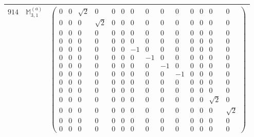 \documentclass[fleqn,8pt,landscape]{jsarticle}
\begin{document}
\begin{center}
\begin{longtable}{ccc}
$ 914 $ & $ \mathbb{M}_{3,1}^{(a)} $ & $ \begin{pmatrix} 0 & 0 & \sqrt{2} & 0 & 0 & 0 & 0 & 0 & 0 & 0 & 0 & 0 & 0 & 0 \\ 0 & 0 & 0 & \sqrt{2} & 0 & 0 & 0 & 0 & 0 & 0 & 0 & 0 & 0 & 0 \\ 0 & 0 & 0 & 0 & 0 & 0 & 0 & 0 & 0 & 0 & 0 & 0 & 0 & 0 \\ 0 & 0 & 0 & 0 & 0 & 0 & 0 & 0 & 0 & 0 & 0 & 0 & 0 & 0 \\ 0 & 0 & 0 & 0 & 0 & 0 & -1 & 0 & 0 & 0 & 0 & 0 & 0 & 0 \\ 0 & 0 & 0 & 0 & 0 & 0 & 0 & -1 & 0 & 0 & 0 & 0 & 0 & 0 \\ 0 & 0 & 0 & 0 & 0 & 0 & 0 & 0 & -1 & 0 & 0 & 0 & 0 & 0 \\ 0 & 0 & 0 & 0 & 0 & 0 & 0 & 0 & 0 & -1 & 0 & 0 & 0 & 0 \\ 0 & 0 & 0 & 0 & 0 & 0 & 0 & 0 & 0 & 0 & 0 & 0 & 0 & 0 \\ 0 & 0 & 0 & 0 & 0 & 0 & 0 & 0 & 0 & 0 & 0 & 0 & 0 & 0 \\ 0 & 0 & 0 & 0 & 0 & 0 & 0 & 0 & 0 & 0 & 0 & 0 & \sqrt{2} & 0 \\ 0 & 0 & 0 & 0 & 0 & 0 & 0 & 0 & 0 & 0 & 0 & 0 & 0 & \sqrt{2} \\ 0 & 0 & 0 & 0 & 0 & 0 & 0 & 0 & 0 & 0 & 0 & 0 & 0 & 0 \\ 0 & 0 & 0 & 0 & 0 & 0 & 0 & 0 & 0 & 0 & 0 & 0 & 0 & 0 \end{pmatrix} $ \\ \hline

\end{longtable}
\end{center}
\end{document}
